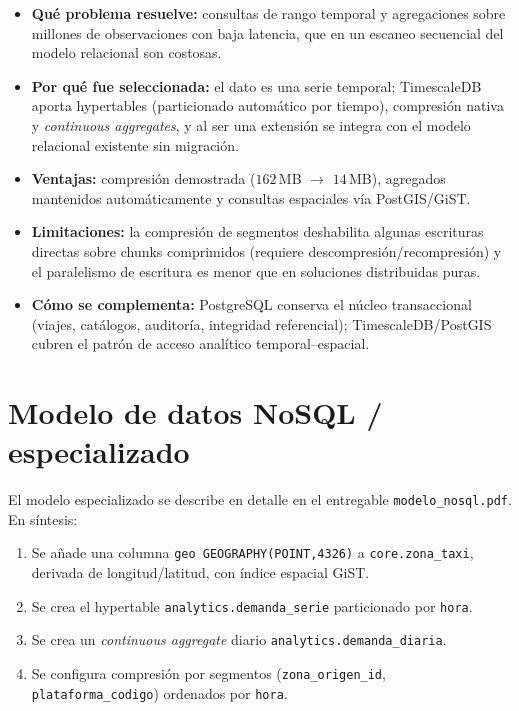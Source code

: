 \documentclass[11pt,a4paper]{article}
\begin{document}
\begin{itemize}
  \item \textbf{Qué problema resuelve:} consultas de rango temporal y agregaciones sobre
        millones de observaciones con baja latencia, que en un escaneo secuencial del modelo
        relacional son costosas.
  \item \textbf{Por qué fue seleccionada:} el dato es una serie temporal; TimescaleDB aporta
        hypertables (particionado automático por tiempo), compresión nativa y
        \emph{continuous aggregates}, y al ser una extensión se integra con el modelo
        relacional existente sin migración.
  \item \textbf{Ventajas:} compresión demostrada ($162$\,MB $\to$ $14$\,MB), agregados
        mantenidos automáticamente y consultas espaciales vía PostGIS/GiST.
  \item \textbf{Limitaciones:} la compresión de segmentos deshabilita algunas escrituras
        directas sobre chunks comprimidos (requiere descompresión/recompresión) y el
        paralelismo de escritura es menor que en soluciones distribuidas puras.
  \item \textbf{Cómo se complementa:} PostgreSQL conserva el núcleo transaccional (viajes,
        catálogos, auditoría, integridad referencial); TimescaleDB/PostGIS cubren el patrón de
        acceso analítico temporal--espacial.
\end{itemize}

\section{Modelo de datos NoSQL / especializado}

El modelo especializado se describe en detalle en el entregable \texttt{modelo\_nosql.pdf}.
En síntesis:

\begin{enumerate}
  \item Se añade una columna \texttt{geo GEOGRAPHY(POINT,4326)} a \texttt{core.zona\_taxi},
        derivada de longitud/latitud, con índice espacial GiST.
  \item Se crea el hypertable \texttt{analytics.demanda\_serie} particionado por \texttt{hora}.
  \item Se crea un \emph{continuous aggregate} diario \texttt{analytics.demanda\_diaria}.
  \item Se configura compresión por segmentos (\texttt{zona\_origen\_id},
        \texttt{plataforma\_codigo}) ordenados por \texttt{hora}.
\end{enumerate}
\end{document}
